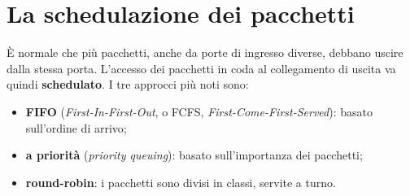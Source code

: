 
\section{La schedulazione dei pacchetti}

È normale che più pacchetti, anche da porte di ingresso diverse, debbano uscire dalla stessa porta. L'accesso dei
pacchetti in coda al collegamento di uscita va quindi \textbf{schedulato}. I tre approcci più noti sono:

\begin{itemize}
    \item \textbf{FIFO} (\emph{First-In-First-Out}, o FCFS, \emph{First-Come-First-Served}): basato sull'ordine di arrivo;
    \item \textbf{a priorità} (\emph{priority queuing}): basato sull'importanza dei pacchetti;
    \item \textbf{round-robin}: i pacchetti sono divisi in classi, servite a turno.
\end{itemize}

